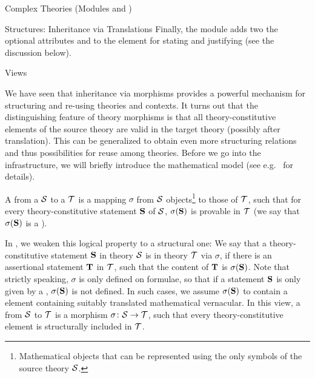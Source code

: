 \begin{tchapter}[id=complex-theories,short=Complex Theories]{Complex Theories (Modules
     and )}
\begin{tsection}[id=morphisms]{Structures: Inheritance via Translations}
Finally, the  module adds two the optional attributes
 and  to
the  element for stating and justifying 
(see the discussion below).
\end{tsection}

\begin{tsection}[id=views]{Views}
  
  We have seen that inheritance via morphisms provides a powerful mechanism for
  structuring and re-using theories and contexts. It turns out that the distinguishing
  feature of theory morphisms is that all theory-constitutive elements of the source
  theory are valid in the target theory (possibly after translation). This can be
  generalized to obtain even more structuring relations and thus possibilities for reuse
  among theories. Before we go into the \omdoc infrastructure, we will briefly introduce
  the mathematical model (see e.g.~\cite{Hutter:mocsv00} for details).

  A  from a  ${\cal S}$ to a  ${\cal T}$
  is a mapping $\sigma$ from ${\cal S}$ objects\footnote{Mathematical objects that can be
    represented using the only symbols of the source theory ${\cal S}$.} to those of ${\cal T}$,
  such that for every theory-constitutive statement ${\bf S}$ of ${\cal S}$, $\sigma({\bf S})$ is
  provable in ${\cal T}$ (we say that $\sigma({\bf S})$ is a ).
   
  In \omdoc, we weaken this logical property to a structural one: We say that a
  theory-constitutive statement ${\bf S}$ in theory ${\cal S}$ is
   in theory ${\cal T}$ via $\sigma$, if there is an
  assertional statement ${\bf T}$ in ${\cal T}$, such that the content
  of ${\bf T}$ is $\sigma({\bf S})$.  Note that strictly speaking, $\sigma$ is only defined on
  formulae, so that if a statement ${\bf S}$ is only given by a , $\sigma({\bf S})$
  is not defined. In such cases, we assume $\sigma({\bf S})$ to contain a 
  element containing suitably translated mathematical vernacular. In this view, a
   from ${\cal S}$ to ${\cal T}$ is a morphism
  $\sigma\colon{\cal S}\to{\cal T}$, such that every theory-constitutive element is structurally
  included in ${\cal T}$.
  

\end{tsection}
\end{tchapter}
